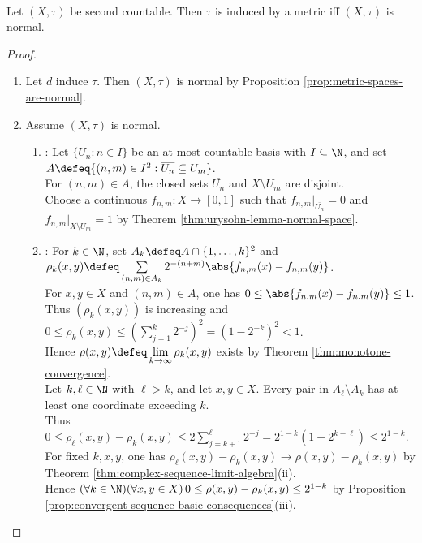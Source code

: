 \begin{theorem} \label{thm:urysohn-metrization-second-countable} \\
Let $(X,\tau)$ be second countable. Then $\tau$ is induced by a metric iff $(X,\tau)$ is normal.
\begin{proof}
\begin{enumerate}[label=\roman*.]
\setlength{\itemsep}{0pt}
\item[$(\Rightarrow)$] Let $d$ induce $\tau$. Then $(X,\tau)$ is normal by Proposition \ref{prop:metric-spaces-are-normal}.
\item[$(\Leftarrow)$] Assume $(X,\tau)$ is normal.
\begin{enumerate}[label=(\alph*)]
\setlength{\itemsep}{0pt}
\item {}: Let $\{U_n:n\in I\}$ be an at most countable basis with $I\subseteq\N$, and set $A\defeq\{(n,m)\in I^2:\overline{U_n}\subseteq U_m\}$.\\
For $(n,m)\in A$, the closed sets $\overline{U_n}$ and $X\setminus U_m$ are disjoint.\\
Choose a continuous $f_{n,m}:X\to[0,1]$ such that $f_{n,m}|_{\overline{U_n}}=0$ and $f_{n,m}|_{X\setminus U_m}=1$ by Theorem \ref{thm:urysohn-lemma-normal-space}.
\item {}: For $k\in\N$, set $A_k\defeq A\cap\{1,\ldots,k\}^2$ and $\rho_k(x,y)\defeq\sum\limits_{(n,m)\in A_k}2^{-(n+m)}\abs{f_{n,m}(x)-f_{n,m}(y)}$.\\
For $x,y\in X$ and $(n,m)\in A$, one has $0\leq\abs{f_{n,m}(x)-f_{n,m}(y)}\leq1$.\\
Thus $(\rho_k(x,y))$ is increasing and $0\leq\rho_k(x,y)\leq(\sum\limits_{j=1}^k2^{-j})^2=(1-2^{-k})^2<1$.\\
Hence $\rho(x,y)\defeq\lim\limits_{k\to\infty}\rho_k(x,y)$ exists by Theorem \ref{thm:monotone-convergence}.\\
Let $k,\ell\in\N$ with $\ell>k$, and let $x,y\in X$. Every pair in $A_\ell\setminus A_k$ has at least one coordinate exceeding $k$.\\
Thus $0\leq\rho_\ell(x,y)-\rho_k(x,y)\leq2\sum\limits_{j=k+1}^{\ell}2^{-j}=2^{1-k}(1-2^{k-\ell})\leq2^{1-k}$.\\
For fixed $k,x,y$, one has $\rho_\ell(x,y)-\rho_k(x,y)\to\rho(x,y)-\rho_k(x,y)$ by Theorem \ref{thm:complex-sequence-limit-algebra}(ii).\\
Hence $(\forall k\in\N)(\forall x,y\in X)\,0\leq\rho(x,y)-\rho_k(x,y)\leq2^{1-k}$ by Proposition \ref{prop:convergent-sequence-basic-consequences}(iii).

\end{enumerate}
\end{enumerate}
\end{proof}
\end{theorem}
